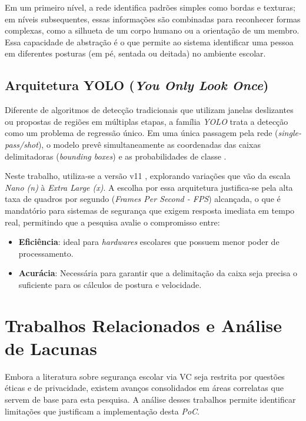 \documentclass[12pt]{article}
\begin{document}
Em um primeiro nível, a rede identifica padrões simples como bordas e texturas; em níveis subsequentes, essas
informações são combinadas para reconhecer formas complexas, como a silhueta de um corpo humano ou a orientação
de um membro. Essa capacidade de abstração é o que permite ao sistema identificar uma pessoa em diferentes 
posturas (em pé, sentada ou deitada) no ambiente escolar.

\subsection{Arquitetura YOLO (\textit{You Only Look Once})}

Diferente de algoritmos de detecção tradicionais que utilizam janelas deslizantes ou propostas de regiões em
múltiplas etapas, a família \textit{YOLO} trata a detecção como um problema de regressão único. Em uma única
passagem pela rede (\textit{single-pass/shot}), o modelo prevê simultaneamente as coordenadas das caixas 
delimitadoras (\textit{bounding boxes}) e as probabilidades de classe \cite{yolo:20}.

Neste trabalho, utiliza-se a versão v11 \cite{ultralytics_yolo11_pt}, explorando variações que vão da escala 
\textit{Nano (n)} à \textit{Extra Large (x)}. A escolha por essa arquitetura justifica-se pela alta taxa de
quadros por segundo (\textit{Frames Per Second - FPS}) alcançada, o que é mandatório para sistemas de segurança
que exigem resposta imediata em tempo real, permitindo que a pesquisa avalie o compromisso entre:

\begin{itemize}
    \item \textbf{Eficiência}: ideal para \textit{hardwares} escolares que possuem menor poder de processamento.
    
    \item \textbf{Acurácia}: Necessária para garantir que a delimitação da caixa seja precisa o suficiente
    para os cálculos de postura e velocidade.
    
\end{itemize}

\section{Trabalhos Relacionados e Análise de Lacunas}

Embora a literatura sobre segurança escolar via VC seja restrita por questões éticas e de privacidade, 
existem avanços consolidados em áreas correlatas que servem de base para esta pesquisa. A análise desses
trabalhos permite identificar limitações que justificam a implementação desta \textit{PoC}.
\end{document}
